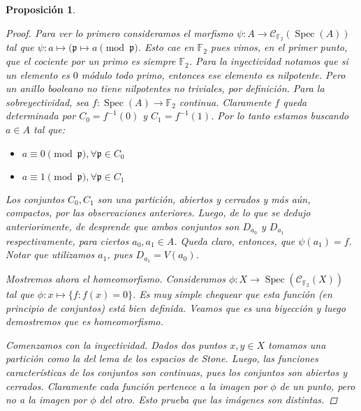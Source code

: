\documentclass[11pt,a4paper, spanish,oneside,fleqn]{article}
\newtheorem{prop}[teo]{Proposición}
\theoremstyle{definition}
\newcommand{\FF}{\mathbb{F}}
\DeclareMathOperator{\spec}{Spec}
\begin{document}
\begin{prop}
\begin{proof}
Para ver lo primero consideramos el morfismo $\psi : A \to \mathscr{C}_{\FF_2}(\spec(A))$ tal que
$\psi : a\mapsto (\mathfrak{p}\mapsto a \pmod{\mathfrak{p}}$. Esto cae en $\FF_2$ pues vimos, en el primer punto, 
que el cociente por un primo es siempre $\FF_2$.
Para la inyectividad notamos que si un elemento es $0$ m\'odulo todo primo, entonces ese elemento es nilpotente.
Pero un anillo booleano no tiene nilpotentes no triviales, por definici\'on.
Para la sobreyectividad, sea $f : \spec(A) \to \FF_2$ continua. Claramente $f$ queda determinada por $C_0 = f^{-1}(0)$ y $C_1 = f^{-1}(1)$.
Por lo tanto estamos buscando $a\in A$ tal que:
\begin{itemize}
  \item $a\equiv 0 \pmod{\mathfrak{p}}, \forall \mathfrak{p} \in C_0$
  \item $a\equiv 1 \pmod{\mathfrak{p}}, \forall \mathfrak{p} \in C_1$
\end{itemize}
Los conjuntos $C_0,C_1$ son una partici\'on, abiertos y cerrados y m\'as a\'un, compactos, por las observaciones anteriores.
Luego, de lo que se dedujo anteriorimente, de desprende que ambos conjuntos son $D_{a_0}$ y $D_{a_1}$ respectivamente,
para ciertos $a_0,a_1\in A$.
Queda claro, entonces, que $\psi(a_1) = f$. Notar que utilizamos $a_1$, pues $D_{a_1} = V(a_0)$.

Mostremos ahora el homeomorfismo.
Consideramos $\phi : X \to \spec(\mathscr{C}_{\FF_2}(X))$ tal que
$\phi : x \mapsto \{ f : f(x) = 0 \}$. Es muy simple chequear que
esta funci\'on (en principio de conjuntos) est\'a bien definida.
Veamos que es una biyecci\'on y luego demostremos que es homeomorfismo.


Comenzamos con la inyectividad.
Dados dos puntos $x,y\in X$ tomamos una partici\'on como la del lema de los
espacios de Stone.
Luego, las funciones caracter\'isticas de los conjuntos son continuas,
pues los conjuntos son abiertos y cerrados. Claramente cada funci\'on
pertenece a la imagen por $\phi$ de un punto, pero no a la imagen por
$\phi$ del otro.
Esto prueba que las im\'agenes son distintas.


\end{proof}
\end{prop}
\end{document}
